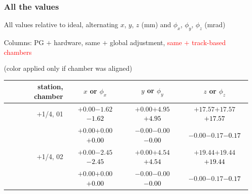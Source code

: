 \documentclass[compress]{beamer}
\begin{document}
\begin{frame}
\frametitle{All the values}
\tiny

All values relative to ideal, alternating $x$, $y$, $z$ (mm) and $\phi_x$, $\phi_y$, $\phi_z$ (mrad)

Columns: PG $+$ hardware, same $+$ global adjustment, \textcolor{red}{same $+$ track-based chambers}

\hfill (color applied only if chamber was aligned)

\vfill
\renewcommand{\arraystretch}{1.1}
\begin{tabular}{r | c | c | c}
station, chamber & $x$ or $\phi_x$ & $y$ or $\phi_y$ & $z$ or $\phi_z$ \\\hline
$+$1/4, 01 & $+0.00$\hspace{0.1 cm}$-1.62$\hspace{0.1 cm}\textcolor{black}{$-1.62$} & $+0.00$\hspace{0.1 cm}$+4.95$\hspace{0.1 cm}\textcolor{black}{$+4.95$} & $+17.57$\hspace{0.1 cm}$+17.57$\hspace{0.1 cm}\textcolor{black}{$+17.57$} \\
           & $+0.00$\hspace{0.1 cm}$+0.00$\hspace{0.1 cm}\textcolor{black}{$+0.00$} & $-0.00$\hspace{0.1 cm}$-0.00$\hspace{0.1 cm}\textcolor{black}{$-0.00$} & $-0.00$\hspace{0.1 cm}$-0.17$\hspace{0.1 cm}\textcolor{black}{$-0.17$} \\
$+$1/4, 02 & $+0.00$\hspace{0.1 cm}$-2.45$\hspace{0.1 cm}\textcolor{black}{$-2.45$} & $+0.00$\hspace{0.1 cm}$+4.54$\hspace{0.1 cm}\textcolor{black}{$+4.54$} & $+19.44$\hspace{0.1 cm}$+19.44$\hspace{0.1 cm}\textcolor{black}{$+19.44$} \\
           & $+0.00$\hspace{0.1 cm}$+0.00$\hspace{0.1 cm}\textcolor{black}{$+0.00$} & $-0.00$\hspace{0.1 cm}$-0.00$\hspace{0.1 cm}\textcolor{black}{$-0.00$} & $-0.00$\hspace{0.1 cm}$-0.17$\hspace{0.1 cm}\textcolor{black}{$-0.17$} \\

\end{tabular}
\end{frame}
\end{document}
